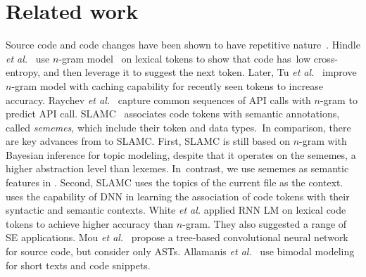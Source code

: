 \section{Related work}
\label{related}




 Source code and code changes
have been shown to have repetitive
nature~\cite{fse14-barr,gabel-fse10,natural,semdiff}. 
%
%
Hindle {\em et al.}~\cite{natural} use $n$-gram model~\cite{manning99}
on lexical tokens to show that code has~low cross-entropy, and then
leverage it to suggest the next token. Later, Tu {\em et
  al.}~\cite{tu-fse14} improve $n$-gram model with caching capability
for recently seen tokens to increase 
accuracy. Raychev {\em et al.}~\cite{ethz-pldi14} capture common
sequences of API calls with $n$-gram to predict API call.
%
SLAMC~\cite{fse13} associates code tokens with
semantic annotations, called {\em sememes}, which include their token
and data types.~In comparison, there are key advances from {\tool} to
SLAMC. First, SLAMC is still based on $n$-gram with Bayesian
inference for topic modeling, despite that it operates on the sememes,
a higher abstraction level than lexemes.
In~contrast, we use sememes as semantic features in
{\tool}. Second, SLAMC uses the topics of the current file as the
context.
{\tool} uses the capability of DNN in learning the association of code
tokens with their syntactic and semantic contexts.
White {\em et al.} \cite{white-msr15} applied RNN LM on lexical code
tokens to achieve higher accuracy than $n$-gram. They also suggested a
range of SE applications. Mou {\em et al.}~\cite{tbcnn14} propose a
tree-based convolutional neural network for source code, but
consider only ASTs. Allamanis {\em et al.}~\cite{bimodal15} use bimodal
modeling for short texts and code snippets.

